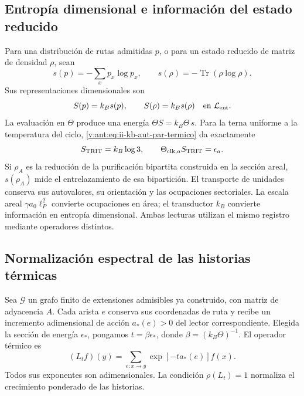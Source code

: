 \subsection{Entropía dimensional e información del estado reducido}

Para una distribución de rutas admitidas \(p\), o para un estado
reducido de matriz de densidad \(\rho\), sean
\[
 s(p)=-\sum_xp_x\log p_x,\qquad
 s(\rho)=-\operatorname{Tr}(\rho\log\rho).
\]
Sus representaciones dimensionales son
\begin{equation}
 S(p)=k_Bs(p),\qquad S(\rho)=k_Bs(\rho)
 \quad\text{en }\mathcal L_{\rm ent}.
 \label{v:ant:eq:ii-kb-aut-entropia}
\end{equation}
La evaluación en \(\Theta\) produce una energía
\(\Theta S=k_B\Theta\,s\). Para la terna uniforme a la temperatura
del ciclo, \eqref{v:ant:eq:ii-kb-aut-par-termico} da exactamente
\[
 S_{\rm TRIT}=k_B\log3,\qquad
 \Theta_{{\rm clk},a}S_{\rm TRIT}=\epsilon_a.
\]
Si \(\rho_A\) es la reducción de la purificación bipartita
construida en la sección areal, \(s(\rho_A)\) mide el entrelazamiento
de esa bipartición. El transporte de unidades conserva sus
autovalores, su orientación y las ocupaciones sectoriales. La escala
areal \(\gamma a_0\ell_P^2\) convierte ocupaciones en área; el
transductor \(k_B\) convierte información en entropía dimensional.
Ambas lecturas utilizan el mismo registro mediante operadores distintos.

\subsection{Normalización espectral de las historias térmicas}

Sea \(\mathcal G\) un grafo finito de extensiones admisibles ya
construido, con matriz de adyacencia \(A\). Cada arista \(e\) conserva
sus coordenadas de ruta y recibe un incremento adimensional de acción
\(a_*(e)>0\) del lector correspondiente. Elegida la sección de energía
\(\epsilon_*\), pongamos \(t=\beta\epsilon_*\), donde
\(\beta=(k_B\Theta)^{-1}\). El operador térmico es
\begin{equation}
 (L_tf)(y)=\sum_{e:x\to y}\exp[-t a_*(e)]f(x).
 \label{v:ant:eq:ii-kb-aut-operador}
\end{equation}
Todos sus exponentes son adimensionales. La condición
\(\rho(L_t)=1\) normaliza el crecimiento ponderado de las historias.

